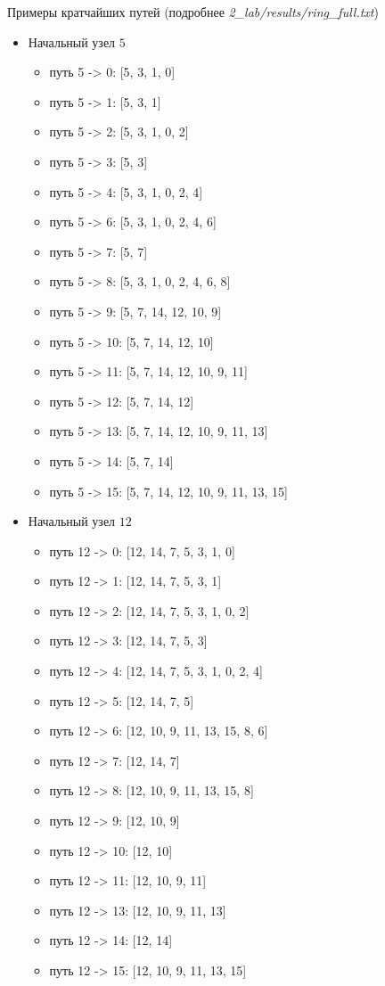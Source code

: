 \documentclass[a4paper,12pt]{article}
\begin{document}
    Примеры кратчайших путей (подробнее \textsl{2\_lab/results/ring\_full.txt})
    \begin{itemize}
        \item Начальный узел $ 5 $
        \begin{itemize}
            \item путь 5 -> 0: [5, 3, 1, 0]
            \item путь 5 -> 1: [5, 3, 1]
            \item путь 5 -> 2: [5, 3, 1, 0, 2]
            \item путь 5 -> 3: [5, 3]
            \item путь 5 -> 4: [5, 3, 1, 0, 2, 4]
            \item путь 5 -> 6: [5, 3, 1, 0, 2, 4, 6]
            \item путь 5 -> 7: [5, 7]
            \item путь 5 -> 8: [5, 3, 1, 0, 2, 4, 6, 8]
            \item путь 5 -> 9: [5, 7, 14, 12, 10, 9]
            \item путь 5 -> 10: [5, 7, 14, 12, 10]
            \item путь 5 -> 11: [5, 7, 14, 12, 10, 9, 11]
            \item путь 5 -> 12: [5, 7, 14, 12]
            \item путь 5 -> 13: [5, 7, 14, 12, 10, 9, 11, 13]
            \item путь 5 -> 14: [5, 7, 14]
            \item путь 5 -> 15: [5, 7, 14, 12, 10, 9, 11, 13, 15]
        \end{itemize}
        \item Начальный узел $ 12 $
        \begin{itemize}
            \item путь 12 -> 0: [12, 14, 7, 5, 3, 1, 0]
            \item путь 12 -> 1: [12, 14, 7, 5, 3, 1]
            \item путь 12 -> 2: [12, 14, 7, 5, 3, 1, 0, 2]
            \item путь 12 -> 3: [12, 14, 7, 5, 3]
            \item путь 12 -> 4: [12, 14, 7, 5, 3, 1, 0, 2, 4]
            \item путь 12 -> 5: [12, 14, 7, 5]
            \item путь 12 -> 6: [12, 10, 9, 11, 13, 15, 8, 6]
            \item путь 12 -> 7: [12, 14, 7]
            \item путь 12 -> 8: [12, 10, 9, 11, 13, 15, 8]
            \item путь 12 -> 9: [12, 10, 9]
            \item путь 12 -> 10: [12, 10]
            \item путь 12 -> 11: [12, 10, 9, 11]
            \item путь 12 -> 13: [12, 10, 9, 11, 13]
            \item путь 12 -> 14: [12, 14]
            \item путь 12 -> 15: [12, 10, 9, 11, 13, 15]
        \end{itemize}
    \end{itemize}
\end{document}
